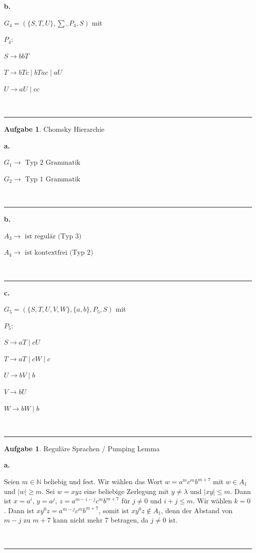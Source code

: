\documentclass[10pt,leqno ]{article}
\theoremstyle{definition}
\newtheorem{problem}[theorem]{Aufgabe}
\newenvironment{solution}[1][L]{\begin{doublespace}\textbf{#1.}\quad }{\ \rule{0.5em}{0.5em}\end{doublespace}}
\begin{document}
\begin{solution}[b]

    \( G_4 = ( \{ S,T,U \}, \sum, P_4, S ) \) mit 

    $P_4:$ 

    \( S \to bbT \) 

    \( T \to bTc \mid bTac \mid aU \) 

    \( U \to aU \mid cc \) 
    
\end{solution}

\begin{problem}
    Chomsky Hierarchie
\end{problem}

\begin{solution}[a]
    
    \( G_1 \to \text{ Typ 2 Grammatik}\)

    \( G_2 \to \text{ Typ 1 Grammatik}\)

\end{solution}

\begin{solution}[b]

    \( A_3 \to \text{ ist regulär (Typ 3)} \)

    \( A_4 \to \text{ ist kontextfrei (Typ 2)} \)
    
\end{solution}

\begin{solution}[c]

    \( G_5 = ( \{ S,T,U,V,W \}, \{ a,b \}, P_5, S ) \) mit 

    $P_5:$ 

    \( S \to aT \mid cU \) 

    \( T \to aT \mid cW \mid c \) 

    \( U \to bV \mid b \)

    \( V \to bU \)

    \( W \to bW \mid b \)

    
\end{solution}

\begin{problem}
    Reguläre Sprachen / Pumping Lemma
\end{problem}

\begin{solution}[a]

    Seien $m \in \mathbb{N}$ beliebig und fest. Wir wählen das Wort $w = a^{m}c^{m}b^{m+7}$ mit $w 
    \in A_1$ und $|w| \geq m$. Sei $w=xyz$ eine beliebige Zerlegung mit $y \neq \lambda$ und $|xy| \leq m $. Dann ist $x=a^{i}$, $y=a^{j}$, $z=a^{m-i-j}c^{m}b^{m+7}$ für $j \neq 0$ und $i+j \leq m$. Wir wählen $k=0$. Dann ist $xy^{0}z=a^{m-j}c^{m}b^{m+7}$, somit ist $xy^{0}z \notin A_1 $, denn der Abstand von $m-j$ zu $m+7$ kann nicht mehr 7 betragen, da $j \neq 0$ ist.
    
\end{solution}
\end{document}
